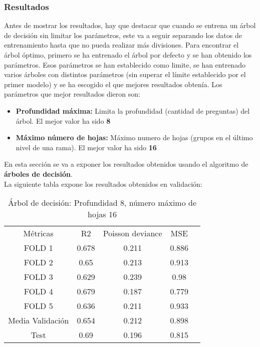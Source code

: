 \subsubsection{Resultados}
\label{sec:res_tree}
Antes de mostrar los resultados, hay que destacar que cuando se entrena un árbol de decisión sin limitar los parámetros, este va a seguir separando los datos de entrenamiento hasta que no pueda realizar más divisiones. Para encontrar el árbol óptimo, primero se ha entrenado el árbol por defecto y se han obtenido los parámetros. Esos parámetros se han establecido como limite, se han entrenado varios árboles con distintos parámetros (sin superar el límite establecido por el primer modelo) y se ha escogido el que mejores resultados obtenía. Los parámetros que mejor resultados dieron son: \\
\begin{itemize}
	\item \textbf{Profundidad máxima:} Limita la profundidad (cantidad de preguntas) del árbol. El mejor valor ha sido \textbf{8}
	\item \textbf{Máximo número de hojas:} Máximo numero de hojas (grupos en el último nivel de una rama). El mejor valor ha sido \textbf{16}
\end{itemize}
En esta sección se va a exponer los resultados obtenidos usando el algoritmo de \textbf{árboles de decisión}.\\
La siguiente tabla expone los resultados obtenidos en validación:
\begin{table}[htbp]
    \begin{tabular}{|c|c|c|c|c}
    \cline{1-4}
    Métricas         & R2    & Poisson deviance & MSE   \\ \cline{1-4}
    FOLD 1           & 0.678 & 0.211            & 0.886 \\ \cline{1-4}
    FOLD 2           & 0.65  & 0.213            & 0.913 \\ \cline{1-4}
    FOLD 3           & 0.629 & 0.239            & 0.98  \\ \cline{1-4}
    FOLD 4           & 0.679 & 0.187            & 0.779 \\ \cline{1-4}
    FOLD 5           & 0.636 & 0.211            & 0.933 \\ \cline{1-4}
    Media Validación & 0.654 & 0.212            & 0.898 \\ \cline{1-4}
    Test             & 0.69  & 0.196            & 0.815 \\ \cline{1-4}
    \end{tabular}
	\caption{Árbol de decisión:  Profundidad 8, número máximo de hojas 16}
	\label{tab:tree_res}
\end{table}
